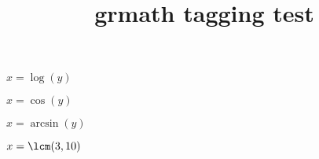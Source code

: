 \documentclass{article}
\title{grmath tagging test}
\begin{document}
$x=\log(y)$

$x=\cos(y)$

$x=\arcsin(y)$

$x=\lcm(3,10)$
\end{document}
